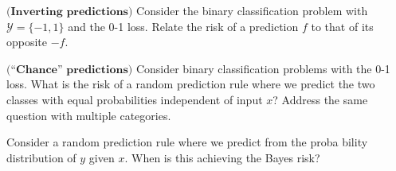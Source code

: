 \begin{exercise}[2.5]
$\textbf{(Inverting predictions)}$ Consider the binary classification problem with
$\mathcal{Y}= \{-1,1\}$ and the 0-1 loss. Relate the risk of a prediction $f$ to that of its opposite $-f$.
\end{exercise}



\begin{exercise}[2.6]
$\textbf{(“Chance” predictions)}$ Consider binary classification problems with
the 0-1 loss. What is the risk of a random prediction rule where we predict the two
classes with equal probabilities independent of input $x$? Address the same question with
multiple categories.
\end{exercise}


\begin{exercise}[2.7]
Consider a random prediction rule where we predict from the proba
bility distribution of $y$ given $x$. When is this achieving the Bayes risk?
\end{exercise}

